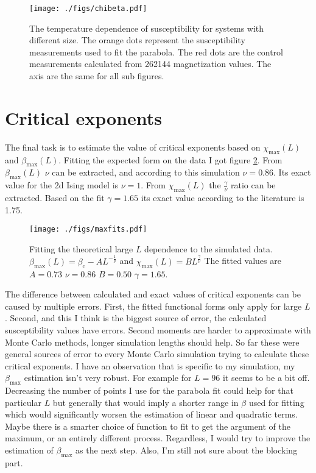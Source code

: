 \documentclass[pdftex,12pt,a4paper]{article}
\begin{document}
\begin{figure}[!h]
	\centering
	\texttt{[image: ./figs/chibeta.pdf]}
	\caption{The temperature dependence of susceptibility for systems with different size. The orange dots represent the susceptibility measurements used to fit the parabola. The red dots are the control measurements calculated from 262144 magnetization values. The axis are the same for all sub figures.}
	\label{chibeta}
\end{figure}

\section{Critical exponents}

The final task is to estimate the value of critical exponents based on $\chi_{\mathrm{max}}(L)$ and $\beta_{\mathrm{max}}(L)$. Fitting the expected form on the data I got figure \ref{maxfits}. From $\beta_{\mathrm{max}}(L)$ $\nu$ can be extracted, and according to this simulation $\nu=0.86$. Its exact value for the 2d Ising model is $\nu=1$. From $\chi_{\mathrm{max}}(L)$ the $\frac{\gamma}{\nu}$ ratio can be extracted. Based on the fit $\gamma=1.65$ its exact value according to the literature is 1.75.

\begin{figure}[!h]
	\centering
	\texttt{[image: ./figs/maxfits.pdf]}
	\caption{Fitting the theoretical large $L$ dependence to the simulated data. $\beta_{\mathrm{max}}(L) = \beta_{\mathrm{c}} - AL^{-\frac{1}{\nu}}$ and $\chi_{\mathrm{max}}(L) = BL^{\frac{\gamma}{\nu}}$ The fitted values are $A=0.73$ $\nu=0.86$ $B=0.50$ $\gamma=1.65$.}
	\label{maxfits}
\end{figure}

The difference between calculated and exact values of critical exponents can be caused by multiple errors. First, the fitted functional forms only apply for large $L$. Second, and this I think is the biggest source of error, the calculated susceptibility values have errors. Second moments are harder to approximate with Monte Carlo methods, longer simulation lengths should help. So far these were general sources of error to every Monte Carlo simulation trying to calculate these critical exponents. I have an observation that is specific to my simulation, my $\beta_{\mathrm{max}}$ estimation isn't very robust. For example for $L=96$ it seems to be a bit off. Decreasing the number of points I use for the parabola fit could help for that particular $L$ but generally that would imply a shorter range in $\beta$ used for fitting which would significantly worsen the estimation of linear and quadratic terms. Maybe there is a smarter choice of function to fit to get the argument of the maximum, or an entirely different process. Regardless, I would try to improve the estimation of $\beta_{\mathrm{max}}$ as the next step. Also, I'm still not sure about the blocking part.
\end{document}
